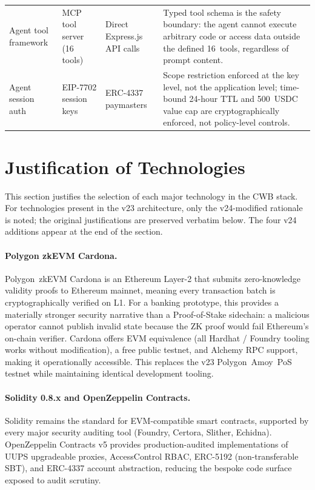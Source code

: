 \begin{table}[H]
\begin{tabular}{p{2.8cm}p{2.9cm}p{2.9cm}p{3.7cm}}
Agent tool framework & MCP tool server (16 tools) & Direct Express.js API calls & Typed tool schema is the safety boundary: the agent cannot execute arbitrary code or access data outside the defined 16~tools, regardless of prompt content. \\
Agent session auth   & EIP-7702 session keys   & ERC-4337 paymasters     & Scope restriction enforced at the key level, not the application level; time-bound 24-hour TTL and 500~USDC value cap are cryptographically enforced, not policy-level controls. \\
\hline
\end{tabular}
\end{table}

\section{Justification of Technologies}
\label{sec:tech-justification}

This section justifies the selection of each major technology in the CWB
stack. For technologies present in the v23 architecture, only the
v24-modified rationale is noted; the original justifications are preserved
verbatim below. The four v24 additions appear at the end of the section.

\paragraph{Polygon zkEVM Cardona.}
Polygon~zkEVM Cardona is an Ethereum Layer-2 that submits zero-knowledge
validity proofs to Ethereum mainnet, meaning every transaction batch is
cryptographically verified on L1. For a banking prototype, this provides a
materially stronger security narrative than a Proof-of-Stake sidechain: a
malicious operator cannot publish invalid state because the ZK proof would
fail Ethereum's on-chain verifier. Cardona offers EVM equivalence (all
Hardhat / Foundry tooling works without modification), a free public testnet,
and Alchemy RPC support, making it operationally accessible. This replaces
the v23 Polygon~Amoy~PoS testnet while maintaining identical development
tooling.

\paragraph{Solidity 0.8.x and OpenZeppelin Contracts.}
Solidity remains the standard for EVM-compatible smart contracts, supported
by every major security auditing tool (Foundry, Certora, Slither, Echidna).
OpenZeppelin Contracts v5 provides production-audited implementations of
UUPS upgradeable proxies, AccessControl RBAC, ERC-5192 (non-transferable
SBT), and ERC-4337 account abstraction, reducing the bespoke code surface
exposed to audit scrutiny.

